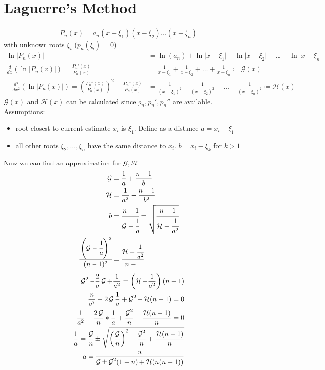 \section{Laguerre's Method}\label{sec:laguerres-method}
\begin{align*}
    P_n(x) = a_n(x-\xi_1)(x-\xi_2)\ldots(x-\xi_n)
\end{align*}
with unknown roots $\xi_i$ ($p_n(\xi_i) = 0$)
\begin{align*}
    \ln | P_n(x) | &= \ln(a_n) + \ln \lvert x- \xi_1 \rvert + \ln \lvert x- \xi_2 \rvert
    +\ldots + \ln \lvert x- \xi_n \rvert\\
    \frac{d}{dx} \left( \ln \lvert P_n(x)\rvert \right) = \frac{P_n'(x)}{P_n(x)}
    &= \frac{1}{x-\xi_1}+\frac{1}{x-\xi_2}+ \ldots + \frac{1}{x-\xi_n} \coloneqq \mathcal{G}(x)\\
    -\frac{d^2}{dx^2}(\ln \lvert P_n(x) \rvert)= \left( \frac{P_n''(x)}{P_n(x)}\right)^2-\frac{P_n''(x)}{P_n(x)}
    &= \frac{1}{(x-\xi_1)^2}+\frac{1}{(x-\xi_2)^2}+\ldots+\frac{1}{(x-\xi_n)^2} \coloneqq \mathcal{H}(x)
\end{align*}
$\mathcal{G}(x)$ and $\mathcal{H}(x)$ can be calculated since $p_n, p_n', p_n''$ are available.
Assumptions:
\begin{itemize}
    \item root closest to current estimate $x_i$ is $\xi_1$.
    Define as a distance $a=x_i-\xi_1$
    \item all other roots $\xi_2, \ldots, \xi_n$ have the same distance to $x_i$. $b=x_i-\xi_k$ for $k>1$
\end{itemize}
Now we can find an approximation for $\mathcal{G}, \mathcal{H}$:
\begin{align*}
    \mathcal{G}&= \frac{1}{a}+ \frac{n-1}{b}\\
    \mathcal{H}&= \frac{1}{a^2}+\frac{n-1}{b^2}\\
    b &= \cfrac{n-1}{\mathcal{G}-\cfrac{1}{a}}= \sqrt{\cfrac{n-1}{\mathcal{H}-\cfrac{1}{a^2}}}\\
    \cfrac{\left(\mathcal{G}-\cfrac{1}{a} \right)^2}{(n-1)^2} &= \cfrac{\mathcal{H}- \cfrac{1}{a^2}}{n-1}\\
\end{align*}
\begin{align*}
    \GO^2-\frac{2}{a}\GO + \frac{1}{a^2}=\left(\HO-\frac{1}{a^2} \right)(n-1)\\
    \frac{n}{a^2}-2 \GO \frac{1}{a}+ \GO^2- \HO(n-1)=0\\
    \frac{1}{a^2}- \frac{2 \GO}{n}*\frac{1}{a}+\frac{\GO^2}{n}-\frac{\HO (n-1)}{n} = 0\\
    \frac{1}{a}= \frac{\GO}{n} \pm \sqrt {\left(\frac{\GO}{n} \right)^2-\frac{\GO^2}{n}+ \frac{\HO (n-1)}{n}}\\
    a=\frac{n}{\GO \pm \GO^2(1-n)+ \HO (n(n-1))}

\end{align*}
